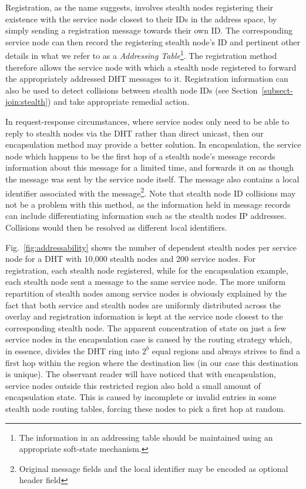 \documentclass[letterpaper]{sig-alternate} %
\begin{document}
Registration, as the name suggests, involves stealth nodes
registering their existence with the service node closest to their
IDs in the address space, by simply sending a registration message
towards their own ID. The corresponding service node can then record
the registering stealth node's ID and pertinent other details in
what we refer to as a \emph{Addressing Table}\footnote{The
information in an addressing table should be maintained using an
appropriate soft-state mechanism.}. The registration method
therefore allows the service node with which a stealth node
registered to forward the appropriately addressed DHT messages to
it. Registration information can also be used to detect collisions
between stealth node IDs (see Section~\ref{subsect-join:stealth})
and take appropriate remedial action.

In request-response circumstances, where service nodes only need to
be able to reply to stealth nodes via the DHT rather than direct
unicast, then our encapsulation method may provide a better
solution. In encapsulation, the service node which happens to be the
first hop of a stealth node's message records information about this
message for a limited time, and forwards it on as though the message
was sent by the service node itself. The message also contains a
local identifier associated with the message\footnote{Original
message fields and the local identifier may be encoded as optional
header field}. Note that stealth node ID collisions may not be a
problem with this method, as the information held in message records
can include differentiating information such as the stealth nodes IP
addresses. Collisions would then be resolved as different local
identifiers.

Fig.~\ref{fig:addressability} shows the number of dependent stealth
nodes per service node for a DHT with 10,000 stealth nodes and 200
service nodes. For registration, each stealth node registered, while
for the encapsulation example, each stealth node sent a message to
the same service node. The more uniform repartition of stealth nodes
among service nodes is obviously explained by the fact that both
service and stealth nodes are uniformly distributed across the
overlay and registration information is kept at the service node
closest to the corresponding stealth node. The apparent
concentration of state on just a few service nodes in the
encapsulation case is caused by the routing strategy which, in
essence, divides the DHT ring into $2^b$ equal regions and always
strives to find a first hop within the region where the destination
lies (in our case this destination is unique). The observant reader
will have noticed that with encapsulation, service nodes outside
this restricted region also hold a small amount of encapsulation
state. This is caused by incomplete or invalid entries in some
stealth node routing tables, forcing these nodes to pick a first hop
at random.
\end{document}

